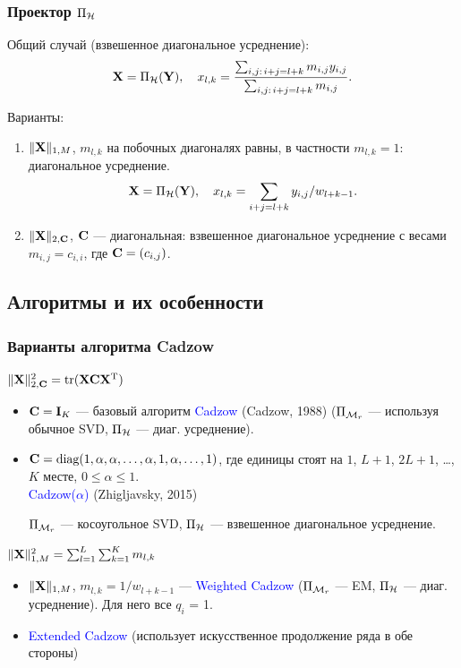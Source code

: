 \documentclass[unicode, notheorems]{beamer}
\begin{document}
\begin{frame}
	\frametitle{Проектор $\Pi_{\mathcal{H}}$}
	Общий случай (взвешенное диагональное усреднение):
	\begin{equation*}
		\mathbf{X} = \Pi_{\mathcal{H}}(\mathbf{Y}), \quad x_{l,k} = \frac{\sum_{i,j:\, i+j=l+k} m_{i, j} y_{i,j}}{\sum_{i,j:\, i+j=l+k} m_{i,j}}.
	\end{equation*}
		
	Варианты:
	\begin{enumerate}
		\item $\|\mathbf{X}\|_{1, M}$, $m_{l,k}$ на побочных диагоналях равны, в частности $m_{l, k} = 1$: диагональное усреднение.
		\begin{equation*}
		\mathbf{X} = \Pi_{\mathcal{H}}(\mathbf{Y}), \quad x_{l,k} = \sum_{i + j = l + k} y_{i, j} / w_{l + k - 1}.
		\end{equation*}
		\item $\|\mathbf{X}\|_{2, \mathbf{C}}$, $\mathbf{C}$ --- диагональная: взвешенное диагональное усреднение с весами $m_{i,j} = c_{i, i}$, где $\mathbf{C} = (c_{i, j})$.
		
	\end{enumerate}
\end{frame}

\subsection{Алгоритмы и их особенности}
\begin{frame}
	\frametitle{Варианты алгоритма Cadzow} 
	$\|\mathbf{X}\|_{2, \mathbf{C}}^2 = \text{tr}(\mathbf{X} \mathbf{C} \mathbf{X}^{\mathrm{T}})$
	\begin{itemize}
		\item $\mathbf{C} = \mathbf{I}_K$ --- базовый алгоритм \textcolor{blue}{Cadzow} (Cadzow, 1988) ($\Pi_{\mathcal{M}_r}$ --- используя обычное SVD, $\Pi_{\mathcal{H}}$ --- диаг. усреднение).
		\item $\mathbf{C} = \text{diag}(1, \alpha, \alpha, \ldots, \alpha, 1, \alpha, \ldots, 1)$,
		где единицы стоят на $1$, $L + 1$, $2L + 1$, \ldots , $K$ месте, $0 \le \alpha \le 1$. \\ \textcolor{blue}{Cadzow($\alpha$)} (Zhigljavsky, 2015)
		
		$\Pi_{\mathcal{M}_r}$ --- косоугольное SVD, $\Pi_{\mathcal{H}}$ --- взвешенное диагональное усреднение.
	\end{itemize}
	
	\vspace{0.3cm}
	$\|\mathbf{X}\|^2_{1, M} =  \sum_{l = 1}^L \sum_{k = 1}^K m_{l, k}$
	\begin{itemize}
		\item $\|\mathbf{X}\|_{1, M}$, $m_{l, k} = 1 / w_{l + k - 1}$ --- \textcolor{blue}{Weighted Cadzow} ($\Pi_{\mathcal{M}_r}$ --- EM, $\Pi_{\mathcal{H}}$ --- диаг. усреднение). Для него все $q_i$ = 1.
		\item \textcolor{blue}{Extended Cadzow} (использует искусственное продолжение ряда в обе стороны)
	\end{itemize}
\end{frame}
\end{document}
